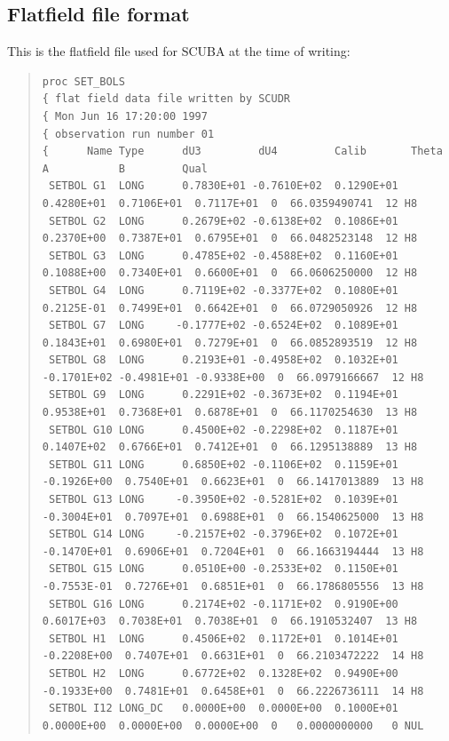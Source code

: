\documentclass[twoside,11pt]{article}
\newenvironment{myquote}{\begin{quote}\begin{small}}{\end{small}\end{quote}}
\renewcommand{\_}{\texttt{\symbol{95}}}
\begin{document}
\begin{landscape}
\section{Flatfield file format\label{app:ff}}

This is the flatfield file used for SCUBA at the time of writing:


\begin{myquote}
\begin{verbatim}
proc SET_BOLS
{ flat field data file written by SCUDR
{ Mon Jun 16 17:20:00 1997
{ observation run number 01
{      Name Type      dU3         dU4         Calib       Theta       A           B         Qual
 SETBOL G1  LONG      0.7830E+01 -0.7610E+02  0.1290E+01  0.4280E+01  0.7106E+01  0.7117E+01  0  66.0359490741  12 H8
 SETBOL G2  LONG      0.2679E+02 -0.6138E+02  0.1086E+01  0.2370E+00  0.7387E+01  0.6795E+01  0  66.0482523148  12 H8
 SETBOL G3  LONG      0.4785E+02 -0.4588E+02  0.1160E+01  0.1088E+00  0.7340E+01  0.6600E+01  0  66.0606250000  12 H8
 SETBOL G4  LONG      0.7119E+02 -0.3377E+02  0.1080E+01  0.2125E-01  0.7499E+01  0.6642E+01  0  66.0729050926  12 H8
 SETBOL G7  LONG     -0.1777E+02 -0.6524E+02  0.1089E+01  0.1843E+01  0.6980E+01  0.7279E+01  0  66.0852893519  12 H8
 SETBOL G8  LONG      0.2193E+01 -0.4958E+02  0.1032E+01 -0.1701E+02 -0.4981E+01 -0.9338E+00  0  66.0979166667  12 H8
 SETBOL G9  LONG      0.2291E+02 -0.3673E+02  0.1194E+01  0.9538E+01  0.7368E+01  0.6878E+01  0  66.1170254630  13 H8
 SETBOL G10 LONG      0.4500E+02 -0.2298E+02  0.1187E+01  0.1407E+02  0.6766E+01  0.7412E+01  0  66.1295138889  13 H8
 SETBOL G11 LONG      0.6850E+02 -0.1106E+02  0.1159E+01 -0.1926E+00  0.7540E+01  0.6623E+01  0  66.1417013889  13 H8
 SETBOL G13 LONG     -0.3950E+02 -0.5281E+02  0.1039E+01 -0.3004E+01  0.7097E+01  0.6988E+01  0  66.1540625000  13 H8
 SETBOL G14 LONG     -0.2157E+02 -0.3796E+02  0.1072E+01 -0.1470E+01  0.6906E+01  0.7204E+01  0  66.1663194444  13 H8
 SETBOL G15 LONG      0.0510E+00 -0.2533E+02  0.1150E+01 -0.7553E-01  0.7276E+01  0.6851E+01  0  66.1786805556  13 H8
 SETBOL G16 LONG      0.2174E+02 -0.1171E+02  0.9190E+00  0.6017E+03  0.7038E+01  0.7038E+01  0  66.1910532407  13 H8
 SETBOL H1  LONG      0.4506E+02  0.1172E+01  0.1014E+01 -0.2208E+00  0.7407E+01  0.6631E+01  0  66.2103472222  14 H8
 SETBOL H2  LONG      0.6772E+02  0.1328E+02  0.9490E+00 -0.1933E+00  0.7481E+01  0.6458E+01  0  66.2226736111  14 H8
 SETBOL I12 LONG_DC   0.0000E+00  0.0000E+00  0.1000E+01  0.0000E+00  0.0000E+00  0.0000E+00  0   0.0000000000   0 NUL

\end{verbatim}
\end{myquote}
\end{landscape}
\end{document}
